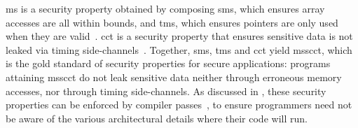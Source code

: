 \documentclass[utf8,acmsmall,review,screen,dvipsnames,anonymous]{acmart}
\begin{document}


\gls*{ms} is a security property obtained by composing \gls*{sms}, which ensures array accesses are all within bounds, and \gls*{tms}, which ensures pointers are only used when they are valid~\cite{azevedo2018meaningsofms,jim2002cyclone,necula2005ccured,nagarakatte2010cets,nagarakatte2009soft,akritidis2009baggy,michael2023mswasm}.
\gls*{cct} is a security property that ensures sensitive data is not leaked via timing side-channels~\cite{kocher1996timing}.
Together, \gls*{sms}, \gls*{tms} and \gls*{cct} yield \gls*{msscct}, which is the gold standard of security properties for secure applications: programs attaining \gls*{msscct} do not leak sensitive data neither through erroneous memory accesses, nor through timing side-channels.
As discussed in , these security properties can be enforced by compiler passes~\cite{bond2017vale,almeida2017jasmin}, to ensure programmers need not be aware of the various architectural details where their code will run.
\end{document}
